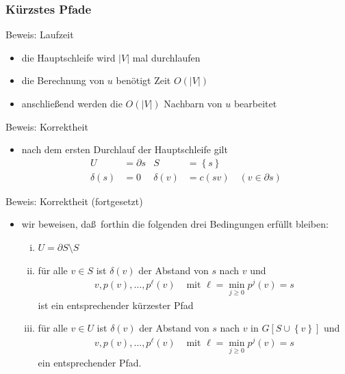 \documentclass[aspectratio=1610, 11pt]{beamer}
\newcommand\cbc[1]{\left\{{#1}\right\}}
\newcommand{\mytitle}{K\"urzstes Pfade}
\begin{document}
\begin{frame}\frametitle{\mytitle}
	\begin{overprint}
		\begin{exampleblock}{Beweis: Laufzeit}
			\begin{itemize}
				\item die Hauptschleife wird $|V|$ mal durchlaufen
				\item die Berechnung von $u$ ben\"otigt Zeit $O(|V|)$
				\item anschlie\ss end werden die $O(|V|)$ Nachbarn von $u$ bearbeitet
			\end{itemize}
		\end{exampleblock}
		\begin{exampleblock}{Beweis: Korrektheit}
			\begin{itemize}
				\item nach dem ersten Durchlauf der Hauptschleife gilt
					\begin{align*}
						U&=\partial s&S&=\cbc s\\\delta(s)&=0&\delta(v)&=c(sv)\quad(v\in\partial s)
					\end{align*}
			\end{itemize}
		\end{exampleblock}
		\begin{exampleblock}{Beweis: Korrektheit (fortgesetzt)}
			\begin{itemize}
				\item wir beweisen, da\ss\ forthin die folgenden drei Bedingungen erf\"ullt bleiben: 
					\begin{enumerate}[(i)]
						\item $U=\partial S\setminus S$
						\item f\"ur alle $v\in S$ ist $\delta(v)$ der Abstand von $s$ nach $v$ und
							\begin{align*}
								v,p(v),\ldots,p^\ell(v)&\mbox{ mit }\ell=\min_{j\geq0}p^j(v)=s
							\end{align*}
							ist ein entsprechender k\"urzester Pfad
						\item f\"ur alle $v\in U$ ist $\delta(v)$ der Abstand von $s$ nach $v$ in $G[S\cup\cbc v]$ und \begin{align*}
								v,p(v),\ldots,p^\ell(v)&\mbox{ mit }\ell=\min_{j\geq0}p^j(v)=s
							\end{align*}
							ein entsprechender Pfad.
					\end{enumerate}
			\end{itemize}

\end{exampleblock}
\end{overprint}
\end{frame}
\end{document}

